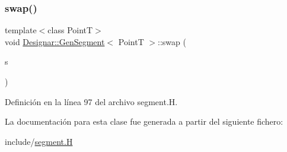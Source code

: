 \mbox{\label{class_designar_1_1_gen_segment_ac597d1811abeb7c572dfd81363c0d120}} 
\subsubsection{\texorpdfstring{swap()}{swap()}}
{\footnotesize\ttfamily template$<$class PointT$>$ \\
void \hyperlink{class_designar_1_1_gen_segment}{Designar\+::\+Gen\+Segment}$<$ PointT $>$\+::swap (\begin{DoxyParamCaption}\item[{\hyperlink{class_designar_1_1_gen_segment}{Gen\+Segment}$<$ PointT $>$ \&}]{s }\end{DoxyParamCaption})\hspace{0.3cm}{\ttfamily [inline]}}



Definición en la línea 97 del archivo segment.\+H.



La documentación para esta clase fue generada a partir del siguiente fichero\+:\begin{DoxyCompactItemize}
\item 
include/\hyperlink{segment_8_h}{segment.\+H}\end{DoxyCompactItemize}
